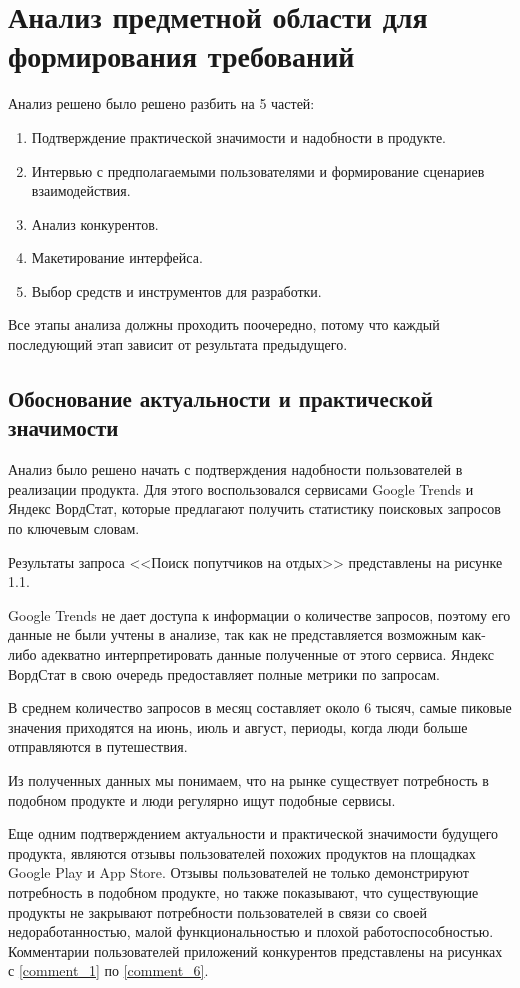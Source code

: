 \section{Анализ предметной области для формирования требований}

Анализ решено было решено разбить на 5 частей:
\begin{enumerate}
    \item Подтверждение практической значимости и надобности в продукте.
    \item Интервью с предполагаемыми пользователями и формирование сценариев взаимодействия.
    \item Анализ конкурентов.
    \item Макетирование интерфейса.
    \item Выбор средств и инструментов для разработки.
\end{enumerate}

Все этапы анализа должны проходить поочередно, потому что каждый последующий этап зависит от результата предыдущего.

\subsection{Обоснование актуальности и практической значимости}
Анализ было решено начать с подтверждения надобности пользователей в реализации продукта. Для этого воспользовался сервисами Google Trends и Яндекс ВордСтат, которые предлагают получить статистику поисковых запросов по ключевым словам.

Результаты запроса <<Поиск попутчиков на отдых>> представлены на рисунке 1.1.


Google Trends не дает доступа к информации о количестве запросов, поэтому его данные не были учтены в анализе, так как не представляется возможным как-либо адекватно интерпретировать данные полученные от этого сервиса. Яндекс ВордСтат в свою очередь предоставляет полные метрики по запросам.

В среднем количество запросов в месяц составляет около 6 тысяч, самые пиковые значения приходятся на июнь, июль и август, периоды, когда люди больше отправляются в путешествия.

Из полученных данных мы понимаем, что на рынке существует потребность в подобном продукте и люди регулярно ищут подобные сервисы.

Еще одним подтверждением актуальности и практической значимости  будущего продукта, являются отзывы пользователей похожих продуктов на площадках Google Play и App Store. Отзывы пользователей не только демонстрируют потребность в подобном продукте, но также показывают, что существующие продукты не закрывают потребности пользователей в связи со своей недоработанностью, малой функциональностью и плохой работоспособностью. Комментарии пользователей приложений конкурентов представлены на рисунках с \ref{comment_1} по \ref{comment_6}.

